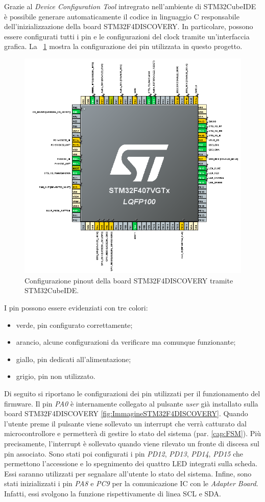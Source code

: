 Grazie al \textit{Device Configuration Tool} intregrato nell'ambiente di STM32CubeIDE è possibile generare automaticamente il codice in linguaggio C responsabile dell'inizializzazione della board STM32F4DISCOVERY. In particolare, possono essere configurati tutti i pin e le configurazioni del clock tramite un'interfaccia grafica. La \Fig~\ref{fig:Pinout} mostra la configurazione dei pin utilizzata in questo progetto. 
\begin{figure}[tbh]
	\centering
	\includegraphics[width=0.9\linewidth]{ImageFiles/Firmware/Pinout}
	\caption{Configurazione pinout della board STM32F4DISCOVERY tramite STM32CubeIDE.}
	\label{fig:Pinout}
\end{figure}
I pin possono essere evidenziati con tre colori:
\begin{itemize}
	\item verde, pin configurato correttamente;
	\item arancio, alcune configurazioni da verificare ma comunque funzionante;
	\item giallo, pin dedicati all'alimentazione;
	\item grigio, pin non utilizzato.
\end{itemize}
Di seguito si riportano le configurazioni dei pin utilizzati per il funzionamento del firmware. Il pin \textit{PA0} è internamente collegato al pulsante \textit{user} già installato sulla board STM32F4DISCOVERY \ref{fig:ImmagineSTM32F4DISCOVERY}. Quando l'utente preme il pulsante viene sollevato un interrupt che verrà catturato dal microcontrollore e permetterà di gestire lo stato del sistema (par. \ref{cap:FSM}). Più precisamente, l'interrupt è sollevato quando viene rilevato un fronte di discesa sul pin associato. Sono stati poi configurati i pin \textit{PD12}, \textit{PD13}, \textit{PD14}, \textit{PD15} che permettono l'accessione e lo spegnimento dei quattro LED integrati sulla scheda. Essi saranno utilizzati per segnalare all'utente lo stato del sistema. Infine, sono stati inizializzati i pin \textit{PA8} e \textit{PC9} per la comunicazione IC con le \textit{Adapter Board}. Infatti, essi svolgono la funzione rispettivamente di linea SCL e SDA.

